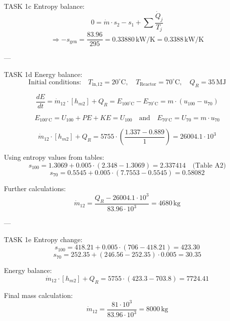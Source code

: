 TASK 1c  
Entropy balance:  
\[
0 = \dot{m} \cdot s_{2} - s_{1} + \sum \frac{\dot{Q}_{j}}{T_{j}}
\]
\[
\Rightarrow -s_{\text{gen}} = \frac{83.96}{295} = 0.33880 \, \text{kW/K} = 0.3388 \, \text{kW/K}
\]

---

TASK 1d  
Energy balance:  
\[
\text{Initial conditions:} \quad T_{\text{in,12}} = 20^\circ\text{C}, \quad T_{\text{Reactor}} = 70^\circ\text{C}, \quad Q_R = 35 \, \text{MJ}
\]

\[
\frac{dE}{dt} = \dot{m}_{12} \cdot [h_{m2}] + Q_R = E_{100^\circ\text{C}} - E_{70^\circ\text{C}} = m \cdot (u_{100} - u_{70})
\]

\[
E_{100^\circ\text{C}} = U_{100} + PE + KE = U_{100} \quad \text{and} \quad E_{70^\circ\text{C}} = U_{70} = m \cdot u_{70}
\]

\[
\dot{m}_{12} \cdot [h_{m2}] + Q_R = 5755 \cdot \left( \frac{1.337 - 0.889}{1} \right) = 26004.1 \cdot 10^3
\]

Using entropy values from tables:  
\[
s_{100} = 1.3069 + 0.005 \cdot (2.348 - 1.3069) = 2.337414 \quad \text{(Table A2)}
\]
\[
s_{70} = 0.5545 + 0.005 \cdot (7.7553 - 0.5545) = 0.58082
\]

Further calculations:  
\[
\dot{m}_{12} = \frac{Q_R - 26004.1 \cdot 10^3}{83.96 \cdot 10^3} = 4680 \, \text{kg}
\]

---

TASK 1e  
Entropy change:  
\[
s_{100} = 418.21 + 0.005 \cdot (706 - 418.21) = 423.30
\]
\[
s_{70} = 252.35 + (246.56 - 252.35) \cdot 0.005 = 30.35
\]

Energy balance:  
\[
\dot{m}_{12} \cdot [h_{m2}] + Q_R = 5755 \cdot (423.3 - 703.8) = 7724.41
\]

Final mass calculation:  
\[
\dot{m}_{12} = \frac{81 \cdot 10^3}{83.96 \cdot 10^3} = 8000 \, \text{kg}
\]